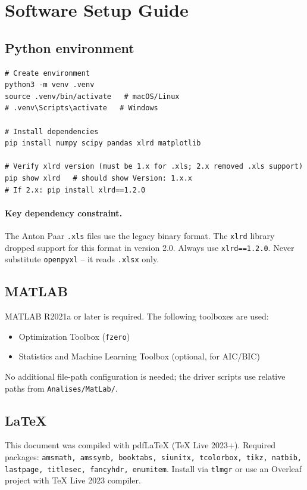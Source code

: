 \documentclass[11pt,a4paper]{article}
\begin{document}
\section{Software Setup Guide}
\label{app:software}

\subsection{Python environment}

\begin{lstlisting}[style=shell]
# Create environment
python3 -m venv .venv
source .venv/bin/activate   # macOS/Linux
# .venv\Scripts\activate   # Windows

# Install dependencies
pip install numpy scipy pandas xlrd matplotlib

# Verify xlrd version (must be 1.x for .xls; 2.x removed .xls support)
pip show xlrd   # should show Version: 1.x.x
# If 2.x: pip install xlrd==1.2.0
\end{lstlisting}

\paragraph{Key dependency constraint.} The Anton Paar \texttt{.xls}
files use the legacy binary format. The \texttt{xlrd} library dropped
support for this format in version 2.0. Always use \texttt{xlrd==1.2.0}.
Never substitute \texttt{openpyxl} -- it reads \texttt{.xlsx} only.

\subsection{MATLAB}

MATLAB R2021a or later is required. The following toolboxes are used:
\begin{itemize}[leftmargin=1.4em,itemsep=1pt]
\item Optimization Toolbox (\texttt{fzero})
\item Statistics and Machine Learning Toolbox (optional, for AIC/BIC)
\end{itemize}
No additional file-path configuration is needed; the driver scripts use
relative paths from \texttt{Analises/MatLab/}.

\subsection{LaTeX}

This document was compiled with pdfLaTeX (TeX Live 2023+). Required
packages: \texttt{amsmath, amssymb, booktabs, siunitx, tcolorbox,
tikz, natbib, lastpage, titlesec, fancyhdr, enumitem}. Install via
\texttt{tlmgr} or use an Overleaf project with TeX Live 2023 compiler.

\bigskip


\end{document}
